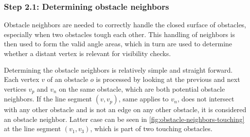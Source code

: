 		\subsubsection{Step 2.1: Determining obstacle neighbors}
			
			Obstacle neighbors are needed to correctly handle the closed surface of obstacles, especially when two obstacles tough each other.
			This handling of neighbors is then used to form the valid angle areas, which in turn are used to determine whether a distant vertex is relevant for visibility checks.
			
			Determining the obstacle neighbors is relatively simple and straight forward.
			Each vertex $v$ of an obstacle $o$ is processed by looking at the previous and next vertices $v_p$ and $v_n$ on the same obstacle, which are both potential obstacle neighbors.
			If the line segment $(v, v_p)$, same applies to $v_n$, does not intersect with any other obstacle and is not an edge on any other obstacle, it is considered an obstacle neighbor.
			Latter case can be seen in \cref{fig:obstacle-neighbors-touching} at the line segment $(v_1, v_3)$, which is part of two touching obstacles.
						
